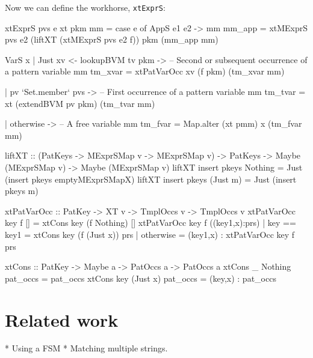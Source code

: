\documentclass[acmsmall]{acmart}
\theoremstyle{theorem}
\theoremstyle{definition}
\theoremstyle{remark}
\begin{document}
Now we can define the workhorse, \lstinline{xtExprS}:
\begin{code}
xtExprS pvs e xt pkm mm
  = case e of
      AppS e1 e2 -> mm { mm_app = xtMExprS pvs e2 (liftXT (xtMExprS pvs e2 f))
                                           pkm (mm_app mm) }

      VarS x | Just xv <- lookupBVM tv pkm
             -> -- Second or subsequent occurrence of a pattern variable
                mm { tm_xvar = xtPatVarOcc xv (f pkm) (tm_xvar mm) }

             | pv `Set.member` pvs
             -> -- First occurrence of a pattern variable
                mm { tm_tvar = xt (extendBVM pv pkm) (tm_tvar mm) }

             | otherwise
             -> -- A free variable
                mm { tm_fvar = Map.alter (xt pmm) x (tm_fvar mm) }

liftXT :: (PatKeys -> MExprSMap v -> MExprSMap v)
        -> PatKeys -> Maybe (MExprSMap v) -> Maybe (MExprSMap v)
liftXT insert pkeys Nothing  = Just (insert pkeys emptyMExprSMapX)
liftXT insert pkeys (Just m) = Just (insert pkeys m)

xtPatVarOcc :: PatKey -> XT v -> TmplOccs v -> TmplOccs v
xtPatVarOcc key f []
  = xtCons key (f Nothing) []
xtPatVarOcc key f ((key1,x):prs)
  | key == key1 = xtCons key (f (Just x)) prs
  | otherwise   = (key1,x) : xtPatVarOcc key f prs

xtCons :: PatKey -> Maybe a -> PatOccs a -> PatOccs a
xtCons _   Nothing  pat_occs = pat_occs
xtCons key (Just x) pat_occs = (key,x) : pat_occs
\end{code}



\section{Related work}

* Using a FSM
* Matching multiple strings.
\end{document}
